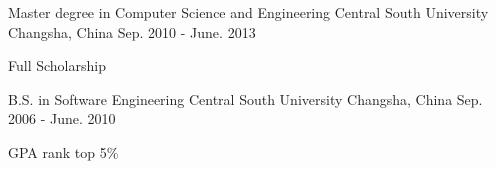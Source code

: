 

\begin{cventries}

  \cventry
    {Master degree in Computer Science and Engineering} %
    {Central South University} %
    {Changsha, China} %
    {Sep. 2010 - June. 2013} %
    {
      \begin{cvitems} %
        \item {Full Scholarship}
      \end{cvitems}
    }
  \cventry
    {B.S. in Software Engineering} %
    {Central South University} %
    {Changsha, China} %
    {Sep. 2006 - June. 2010} %
    {
      \begin{cvitems} %
        \item {GPA rank top 5\%}
      \end{cvitems}
    }

\end{cventries}
